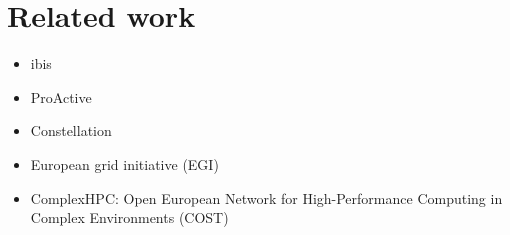 \section{Related work}

\begin{itemize}
  \item ibis
  \item ProActive
  \item Constellation
  \item European grid initiative (EGI)
  \item ComplexHPC: Open European Network for High-Performance Computing in Complex Environments (COST)
\end{itemize}


\cleardoublepage

